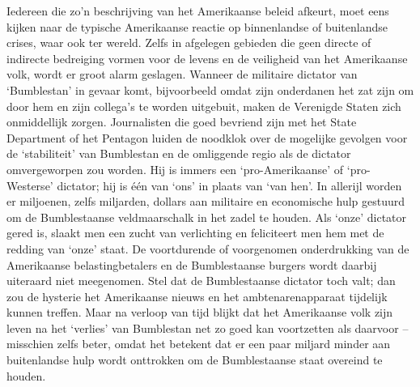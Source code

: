 \documentclass[
  a5paper,
  smalldemyvopaper,10pt,twoside,onecolumn,openright,extrafontsizes,hidelinks]{memoir}
\begin{document}
Iedereen die zo'n beschrijving van het Amerikaanse beleid afkeurt, moet
eens kijken naar de typische Amerikaanse reactie op binnenlandse of
buitenlandse crises, waar ook ter wereld. Zelfs in afgelegen gebieden
die geen directe of indirecte bedreiging vormen voor de levens en de
veiligheid van het Amerikaanse volk, wordt er groot alarm geslagen.
Wanneer de militaire dictator van `Bumblestan' in gevaar komt,
bijvoorbeeld omdat zijn onderdanen het zat zijn om door hem en zijn
collega's te worden uitgebuit, maken de Verenigde Staten zich
onmiddellijk zorgen. Journalisten die goed bevriend zijn met het State
Department of het Pentagon luiden de noodklok over de mogelijke gevolgen
voor de `stabiliteit' van Bumblestan en de omliggende regio als de
dictator omvergeworpen zou worden. Hij is immers een `pro-Amerikaanse'
of `pro-Westerse' dictator; hij is één van `ons' in plaats van `van
hen'. In allerijl worden er miljoenen, zelfs miljarden, dollars aan
militaire en economische hulp gestuurd om de Bumblestaanse
veldmaarschalk in het zadel te houden. Als `onze' dictator gered is,
slaakt men een zucht van verlichting en feliciteert men hem met de
redding van `onze' staat. De voortdurende of voorgenomen onderdrukking
van de Amerikaanse belastingbetalers en de Bumblestaanse burgers wordt
daarbij uiteraard niet meegenomen. Stel dat de Bumblestaanse dictator
toch valt; dan zou de hysterie het Amerikaanse nieuws en het
ambtenarenapparaat tijdelijk kunnen treffen. Maar na verloop van tijd
blijkt dat het Amerikaanse volk zijn leven na het `verlies' van
Bumblestan net zo goed kan voortzetten als daarvoor -- misschien zelfs
beter, omdat het betekent dat er een paar miljard minder aan
buitenlandse hulp wordt onttrokken om de Bumblestaanse staat overeind te
houden.
\end{document}
